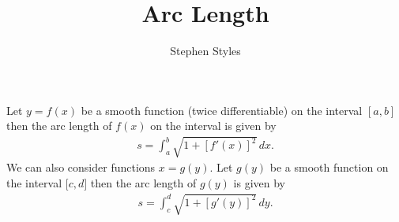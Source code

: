 \documentclass[16pt]{article}
\title{Arc Length}
\author{Stephen Styles}
\theoremstyle{remark}
\begin{document}
\maketitle
\vspace*{-0.5cm}

Let $y = f(x)$ be a smooth function (twice differentiable) on the interval ${[ a, b ]}$ then the arc length of $f(x)$ on the interval is given by 
\begin{align*}
s = \int_a^b \sqrt{1+{[f'(x)]}^2} \, dx.
\end{align*} 
We can also consider functions $x=g(y)$. Let $g(y)$ be a smooth function on the interval ${[c,d}]$ then the arc length of $g(y)$ is given by
\begin{align*}
s = \int_c^d \sqrt{1+{[g'(y)]}^2} \, dy.
\end{align*}
\end{document}
